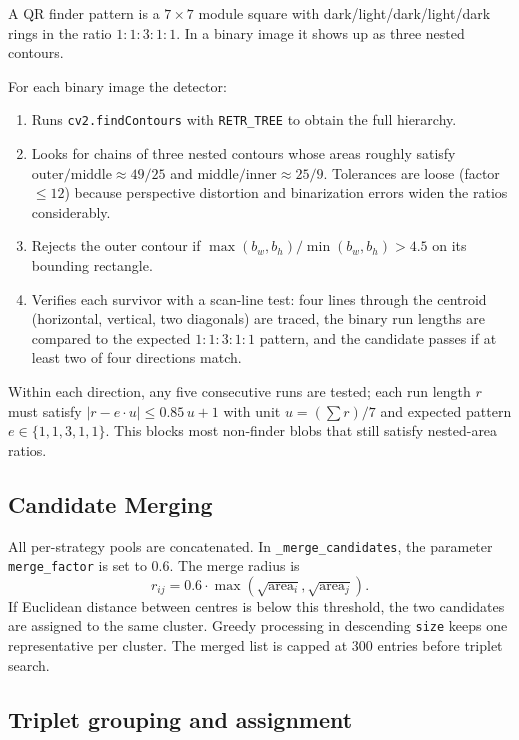 \documentclass[11pt,a4paper]{article}
\begin{document}
A QR finder pattern is a $7\times7$ module square with dark/light/dark/light/dark rings 
in the ratio $1{:}1{:}3{:}1{:}1$. In a binary image it
shows up as three nested contours.

For each binary image the detector:

\begin{enumerate}[leftmargin=1.6em, itemsep=0.2em]
\item Runs \texttt{cv2.findContours} with \texttt{RETR\_TREE} to obtain the
      full hierarchy.
\item Looks for chains of three nested contours whose areas roughly
      satisfy $\text{outer}/\text{middle}\approx 49/25$ and
      $\text{middle}/\text{inner}\approx 25/9$. Tolerances are loose
      (factor $\le 12$) because perspective distortion and binarization
      errors widen the ratios considerably.
\item Rejects the outer contour if
      $\max(b_w,b_h)/\min(b_w,b_h) > 4.5$ on its bounding rectangle.
\item Verifies each survivor with a scan-line test: four lines through the
      centroid (horizontal, vertical, two diagonals) are traced, the
      binary run lengths are compared to the expected
      $1{:}1{:}3{:}1{:}1$ pattern, and the candidate passes if at least
      two of four directions match.
\end{enumerate}

Within each direction, any five consecutive runs are tested; each run
length $r$ must satisfy $|r - e\cdot u| \le 0.85\,u + 1$ with unit
$u = (\sum r)/7$ and expected pattern $e \in \{1,1,3,1,1\}$. This blocks
most non-finder blobs that still satisfy nested-area ratios.

\subsection{Candidate Merging}

All per-strategy pools are concatenated. In \texttt{\_merge\_candidates},
the parameter \texttt{merge\_factor} is set to $0.6$. The merge radius is
\[
r_{ij} = 0.6 \cdot \max\!\left(\sqrt{\mathrm{area}_i}, \sqrt{\mathrm{area}_j}\right).
\]
If Euclidean distance between centres is below this threshold, the two
candidates are assigned to the same cluster. Greedy processing in
descending \texttt{size} keeps one representative per cluster. The merged
list is capped at $300$ entries before triplet search.

\subsection{Triplet grouping and assignment}
\end{document}
